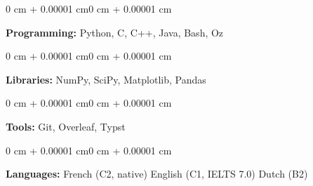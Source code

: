 \documentclass[10pt, letterpaper]{article}
\newenvironment{onecolentry}{
    \begin{adjustwidth}{0 cm + 0.00001 cm}{0 cm + 0.00001 cm}
}{
    \end{adjustwidth}
}
\begin{document}
        \begin{onecolentry}
            \textbf{Programming:} Python, C, C++, Java, Bash, Oz 

               
        \end{onecolentry}
        \vspace{0.02 cm}
        \begin{onecolentry}
            \textbf{Libraries:} NumPy, SciPy, Matplotlib, Pandas
        \end{onecolentry}
        \vspace{0.02 cm}
        \begin{onecolentry}
            \textbf{Tools:} Git, Overleaf, Typst
        \end{onecolentry}
        \vspace{0.02 cm}
        \begin{onecolentry}
            \textbf{Languages:} French (C2, native) \kern 5pt\AND\kern 5pt English (C1, IELTS 7.0) \kern 5pt\AND\kern 5pt Dutch (B2)
        \end{onecolentry}
\end{document}
